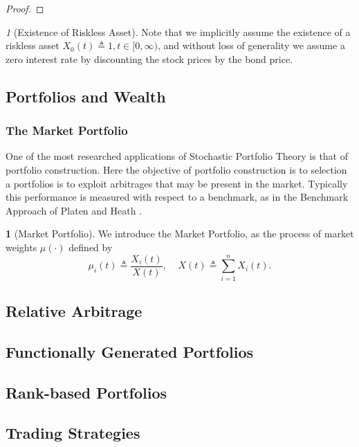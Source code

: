 \documentclass[british]{amsart}
\numberwithin{equation}{section}
\numberwithin{figure}{section}
\theoremstyle{plain}
\theoremstyle{definition}
\newtheorem{defn}[thm]{\protect\definitionname}
\theoremstyle{plain}
\theoremstyle{plain}
\theoremstyle{plain}
\theoremstyle{remark}
\newtheorem{rem}[thm]{\protect\remarkname}
\theoremstyle{plain}
\providecommand{\definitionname}{Definition}
\providecommand{\remarkname}{Remark}
\newcommand{\ranget}{t\in[0,\infty)}
\newcommand{\defeq}{\mathop{\triangleq}}
\begin{document}
\begin{proof}

\end{proof}

\begin{rem} [Existence of Riskless Asset]
	Note that we implicitly assume the existence of a riskless asset 
	$X_{0}(t)\defeq 1,\ranget$, and without loss of generality we assume a zero 
	interest rate by discounting the stock prices by the bond price.
\end{rem}

\subsection{Portfolios and Wealth}

\subsubsection{The Market Portfolio}
One of the most researched applications of Stochastic Portfolio Theory is that 
of portfolio construction. Here the objective of portfolio construction is to 
selection a portfolios is to exploit arbitrages that may be present in the 
market. Typically this performance is measured with respect to a benchmark, as 
in the Benchmark Approach of Platen and Heath \cite{platen2006}.

\begin{defn}[Market Portfolio]
We introduce the Market Portfolio, as the process of market weights $\mu(\cdot)$ 
defined by \begin{equation}
	\mu_{i}(t)\triangleq\frac{X_{i}(t)}{X(t)},\;\;\;\;X(t)\triangleq\sum_{i=1}^{n}X_{i}(t).
\end{equation}
\end{defn}

\subsection{Relative Arbitrage}
\subsection{Functionally Generated Portfolios}
\subsection{Rank-based Portfolios}
\subsection{Trading Strategies}
\end{document}
